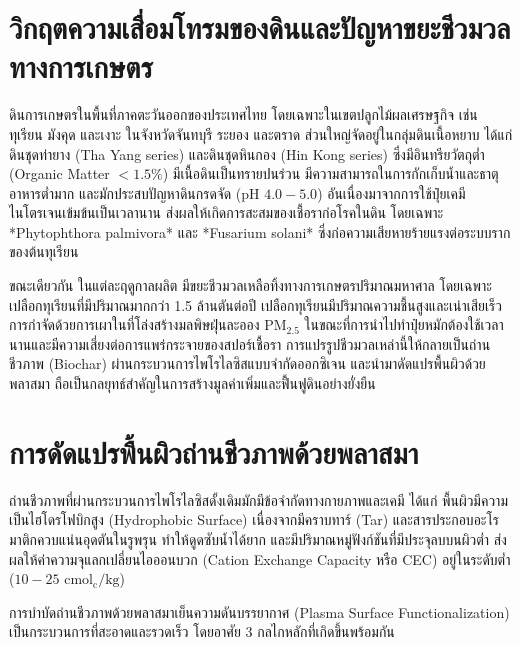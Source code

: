 \clearpage


\section{วิกฤตความเสื่อมโทรมของดินและปัญหาขยะชีวมวลทางการเกษตร}

ดินการเกษตรในพื้นที่ภาคตะวันออกของประเทศไทย โดยเฉพาะในเขตปลูกไม้ผลเศรษฐกิจ เช่น ทุเรียน มังคุด และเงาะ ในจังหวัดจันทบุรี ระยอง และตราด ส่วนใหญ่จัดอยู่ในกลุ่มดินเนื้อหยาบ ได้แก่ ดินชุดท่ายาง (Tha Yang series) และดินชุดหินกอง (Hin Kong series) ซึ่งมีอินทรียวัตถุต่ำ (Organic Matter $< 1.5\%$) มีเนื้อดินเป็นทรายปนร่วน มีความสามารถในการกักเก็บน้ำและธาตุอาหารต่ำมาก และมักประสบปัญหาดินกรดจัด ($\text{pH } 4.0 - 5.0$) อันเนื่องมาจากการใช้ปุ๋ยเคมีไนโตรเจนเข้มข้นเป็นเวลานาน ส่งผลให้เกิดการสะสมของเชื้อราก่อโรคในดิน โดยเฉพาะ *Phytophthora palmivora* และ *Fusarium solani* ซึ่งก่อความเสียหายร้ายแรงต่อระบบรากของต้นทุเรียน

ขณะเดียวกัน ในแต่ละฤดูกาลผลิต มีขยะชีวมวลเหลือทิ้งทางการเกษตรปริมาณมหาศาล โดยเฉพาะเปลือกทุเรียนที่มีปริมาณมากกว่า 1.5 ล้านตันต่อปี เปลือกทุเรียนมีปริมาณความชื้นสูงและเน่าเสียเร็ว การกำจัดด้วยการเผาในที่โล่งสร้างมลพิษฝุ่นละออง $\text{PM}_{2.5}$ ในขณะที่การนำไปทำปุ๋ยหมักต้องใช้เวลานานและมีความเสี่ยงต่อการแพร่กระจายของสปอร์เชื้อรา การแปรรูปชีวมวลเหล่านี้ให้กลายเป็นถ่านชีวภาพ (Biochar) ผ่านกระบวนการไพโรไลซิสแบบจำกัดออกซิเจน และนำมาดัดแปรพื้นผิวด้วยพลาสมา ถือเป็นกลยุทธ์สำคัญในการสร้างมูลค่าเพิ่มและฟื้นฟูดินอย่างยั่งยืน

\section{การดัดแปรพื้นผิวถ่านชีวภาพด้วยพลาสมา}

ถ่านชีวภาพที่ผ่านกระบวนการไพโรไลซิสดั้งเดิมมักมีข้อจำกัดทางกายภาพและเคมี ได้แก่ พื้นผิวมีความเป็นไฮโดรโฟบิกสูง (Hydrophobic Surface) เนื่องจากมีคราบทาร์ (Tar) และสารประกอบอะโรมาติกควบแน่นอุดตันในรูพรุน ทำให้ดูดซับน้ำได้ยาก และมีปริมาณหมู่ฟังก์ชันที่มีประจุลบบนผิวต่ำ ส่งผลให้ค่าความจุแลกเปลี่ยนไอออนบวก (Cation Exchange Capacity หรือ CEC) อยู่ในระดับต่ำ ($10 - 25 \text{ cmol}_{\text{c}}/\text{kg}$)

การบำบัดถ่านชีวภาพด้วยพลาสมาเย็นความดันบรรยากาศ (Plasma Surface Functionalization) เป็นกระบวนการที่สะอาดและรวดเร็ว โดยอาศัย 3 กลไกหลักที่เกิดขึ้นพร้อมกัน

